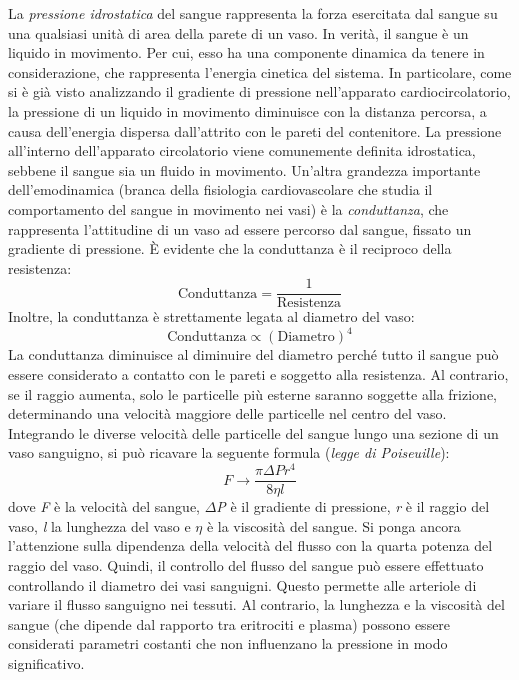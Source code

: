 La \textit{pressione idrostatica} del sangue rappresenta la forza esercitata dal sangue su una qualsiasi unità di area della parete di un vaso. In verità, il sangue è un liquido in movimento. Per cui, esso ha una componente dinamica da tenere in considerazione, che rappresenta l'energia cinetica del sistema. In particolare, come si è già visto analizzando il gradiente di pressione nell'apparato cardiocircolatorio, la pressione di un liquido in movimento diminuisce con la distanza percorsa, a causa dell'energia dispersa dall'attrito con le pareti del contenitore. La pressione all'interno dell'apparato circolatorio viene comunemente definita idrostatica, sebbene il sangue sia un fluido in movimento. Un'altra grandezza importante dell'emodinamica (branca della fisiologia cardiovascolare che studia il comportamento del sangue in movimento nei vasi) è la \textit{conduttanza}, che rappresenta l'attitudine di un vaso ad essere percorso dal sangue, fissato un gradiente di pressione. \`E evidente che la conduttanza è il reciproco della resistenza: 
\begin{equation}
	\text{Conduttanza}=\frac{1}{\text{Resistenza}}
	\label{eq:Conduttanza}
\end{equation}
Inoltre, la conduttanza è strettamente legata al diametro del vaso: 
\begin{equation}
	\text{Conduttanza}\propto(\text{Diametro})^4
	\label{eq:ConduttanzaeDiametro}
\end{equation}
La conduttanza diminuisce al diminuire del diametro perché tutto il sangue può essere considerato a contatto con le pareti e soggetto alla resistenza. Al contrario, se il raggio aumenta, solo le particelle più esterne saranno soggette alla frizione, determinando una velocità maggiore delle particelle nel centro del vaso.
Integrando le diverse velocità delle particelle del sangue lungo una sezione di un vaso sanguigno, si può ricavare la seguente formula (\textit{legge di Poiseuille}):
\begin{equation}
	F\xrightarrow{}\frac{\pi\Delta P r^4}{8 \eta l}
	\label{eq:PoiseuilleLaw}
\end{equation}
dove \textit{F} è la velocità del sangue, \textit{$\Delta$P} è il gradiente di pressione, \textit{r} è il raggio del vaso, \textit{l} la lunghezza del vaso e \textit{$\eta$} è la viscosità del sangue. Si ponga ancora l'attenzione sulla dipendenza della velocità del flusso con la quarta potenza del raggio del vaso. Quindi, il controllo del flusso del sangue può essere effettuato controllando il diametro dei vasi sanguigni. Questo permette alle arteriole di variare il flusso sanguigno nei tessuti. Al contrario, la lunghezza e la viscosità del sangue (che dipende dal rapporto tra eritrociti e plasma) possono essere considerati parametri costanti che non influenzano la pressione in modo significativo.

